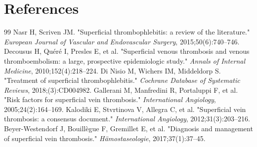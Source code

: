 \section*{References}
\begin{thebibliography}{99}
 Nasr H, Scriven JM. "Superficial thrombophlebitis: a review of the literature." \textit{European Journal of Vascular and Endovascular Surgery}, 2015;50(6):740--746.
 Decousus H, Qu\'er\'e I, Presles E, et al. "Superficial venous thrombosis and venous thromboembolism: a large, prospective epidemiologic study." \textit{Annals of Internal Medicine}, 2010;152(4):218--224.
 Di Nisio M, Wichers IM, Middeldorp S. "Treatment of superficial thrombophlebitis." \textit{Cochrane Database of Systematic Reviews}, 2018;(3):CD004982.
 Gallerani M, Manfredini R, Portaluppi F, et al. "Risk factors for superficial vein thrombosis." \textit{International Angiology}, 2005;24(2):164--169.
 Kalodiki E, Stvrtinova V, Allegra C, et al. "Superficial vein thrombosis: a consensus document." \textit{International Angiology}, 2012;31(3):203--216.
 Beyer-Westendorf J, Bouill{\`e}gue F, Gremillet E, et al. "Diagnosis and management of superficial vein thrombosis." \textit{H{\"a}mostaseologie}, 2017;37(1):37--45.

\end{thebibliography}
